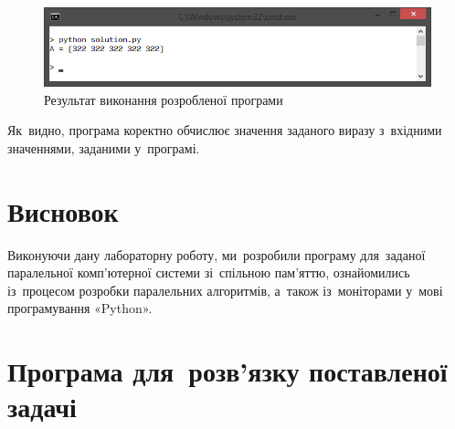 \documentclass[
  a4paper,
  oneside,
  BCOR = 10mm,
  DIV = 12,
  12pt,
  headings = normal,
]{scrartcl}
\begin{document}
      \begin{figure}[!htbp]
        \centering
        \includegraphics[width = \columnwidth]{./assets/p01.png}
        \caption{Результат виконання розробленої програми}
        \label{fig:app-res}
      \end{figure}

      Як~видно, програма коректно обчислює значення заданого виразу з~вхідними значеннями, заданими у~програмі.

  \section{Висновок}
		Виконуючи дану лабораторну роботу, ми~розробили програму для~заданої паралельної комп'ютерної системи зі~спільною пам'яттю, ознайомились із~процесом розробки паралельних алгоритмів, а~також із~моніторами у~мові програмування «\textenglish{Python}».

  \newpage
  \appendix
  \section{Програма для~розв'язку поставленої задачі}

\end{document}
